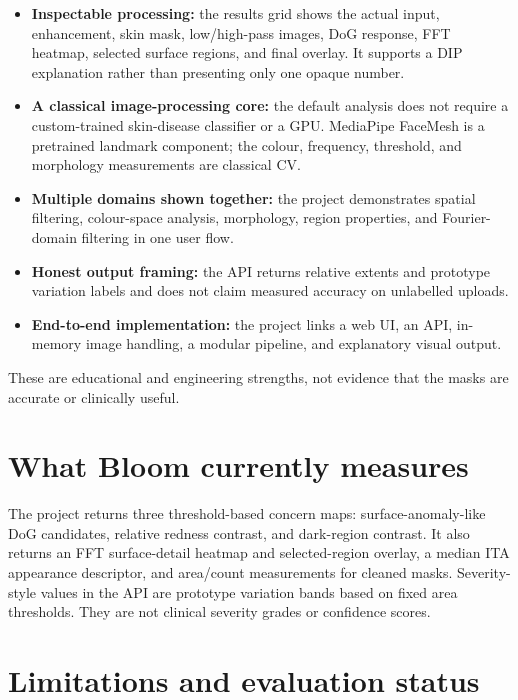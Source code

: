 \documentclass[11pt,a4paper]{article}
\begin{document}
\begin{itemize}
  \item \textbf{Inspectable processing:} the results grid shows the actual input, enhancement, skin mask, low/high-pass images, DoG response, FFT heatmap, selected surface regions, and final overlay. It supports a DIP explanation rather than presenting only one opaque number.
  \item \textbf{A classical image-processing core:} the default analysis does not require a custom-trained skin-disease classifier or a GPU. MediaPipe FaceMesh is a pretrained landmark component; the colour, frequency, threshold, and morphology measurements are classical CV.
  \item \textbf{Multiple domains shown together:} the project demonstrates spatial filtering, colour-space analysis, morphology, region properties, and Fourier-domain filtering in one user flow.
  \item \textbf{Honest output framing:} the API returns relative extents and prototype variation labels and does not claim measured accuracy on unlabelled uploads.
  \item \textbf{End-to-end implementation:} the project links a web UI, an API, in-memory image handling, a modular pipeline, and explanatory visual output.
\end{itemize}

These are educational and engineering strengths, not evidence that the masks are accurate or clinically useful.

\section{What Bloom currently measures}

The project returns three threshold-based concern maps: surface-anomaly-like DoG candidates, relative redness contrast, and dark-region contrast. It also returns an FFT surface-detail heatmap and selected-region overlay, a median ITA appearance descriptor, and area/count measurements for cleaned masks. Severity-style values in the API are prototype variation bands based on fixed area thresholds. They are not clinical severity grades or confidence scores.

\section{Limitations and evaluation status}
\end{document}
